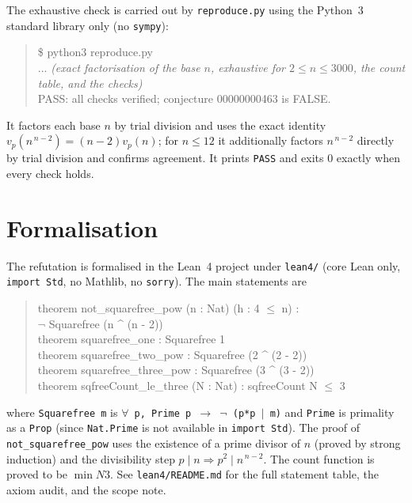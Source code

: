 \documentclass[11pt]{article}
\theoremstyle{definition}
\theoremstyle{remark}
\begin{document}
The exhaustive check is carried out by \texttt{reproduce.py} using the Python~3
standard library only (no \texttt{sympy}):

\begin{quote}\ttfamily
\$ python3 reproduce.py\\
... \textit{(exact factorisation of the base $n$, exhaustive for $2 \le n \le 3000$,
the count table, and the checks)}\\
PASS: all checks verified; conjecture 00000000463 is FALSE.
\end{quote}

It factors each base $n$ by trial division and uses the exact identity
$v_p(n^{\,n-2}) = (n-2)v_p(n)$; for $n \le 12$ it additionally factors
$n^{\,n-2}$ directly by trial division and confirms agreement. It prints
\texttt{PASS} and exits $0$ exactly when every check holds.

\section{Formalisation}

The refutation is formalised in the Lean~4 project under \texttt{lean4/}
(core Lean only, \texttt{import Std}, no Mathlib, no \texttt{sorry}). The main
statements are
\begin{quote}\ttfamily
theorem not\_squarefree\_pow (n : Nat) (h : 4 \(\le\) n) :\\
\hspace*{2em}\(\neg\) Squarefree (n \^{} (n - 2))\\
theorem squarefree\_one : Squarefree 1\\
theorem squarefree\_two\_pow : Squarefree (2 \^{} (2 - 2))\\
theorem squarefree\_three\_pow : Squarefree (3 \^{} (3 - 2))\\
theorem sqfreeCount\_le\_three (N : Nat) : sqfreeCount N \(\le\) 3
\end{quote}
where \texttt{Squarefree m} is \texttt{\(\forall\) p, Prime p \(\to\) \(\neg\) (p*p \(\mid\) m)} and
\texttt{Prime} is primality as a \texttt{Prop} (since \texttt{Nat.Prime} is not
available in \texttt{import Std}). The proof of \texttt{not\_squarefree\_pow}
uses the existence of a prime divisor of $n$ (proved by strong induction) and
the divisibility step $p \mid n \Rightarrow p^2 \mid n^{\,n-2}$. The count
function is proved to be $\min N 3$. See \texttt{lean4/README.md} for the full
statement table, the axiom audit, and the scope note.
\end{document}
